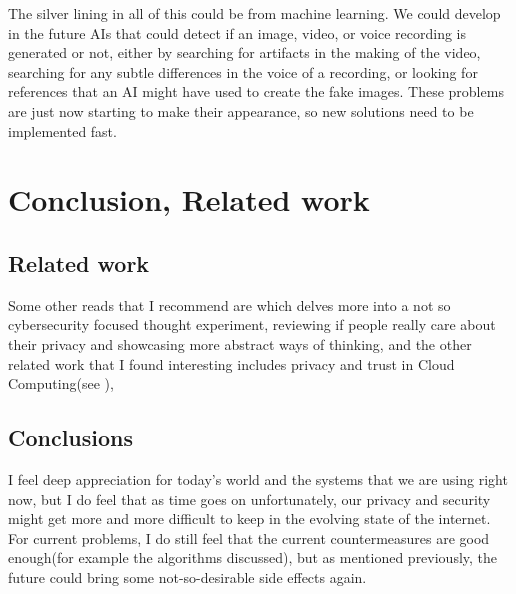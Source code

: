 \documentclass[a4paper,12pt]{report}
\begin{document}
The silver lining in all of this could be from machine learning. We could develop in the future AIs that could detect if an image, video, or voice recording is generated or not, either by searching for artifacts in the making of the video, searching for any subtle differences in the voice of a recording, or looking for references that an AI might have used to create the fake images. These problems are just now starting to make their appearance, so new solutions need to be implemented fast.

\chapter{Conclusion, Related work}

\section{Related work}

Some other reads that I recommend are \cite{Spyros} which delves more into a not so cybersecurity focused thought experiment, reviewing if people really care about their privacy and showcasing more abstract ways of thinking, and the other related work that I found interesting includes privacy and trust in Cloud Computing(see \cite{Siani}),

\section{Conclusions}

I feel deep appreciation for today's world and the systems that we are using right now, but I do feel that as time goes on unfortunately, our privacy and security might get more and more difficult to keep in the evolving state of the internet. For current problems, I do still feel that the current countermeasures are good enough(for example the algorithms discussed), but as mentioned previously, the future could bring some not-so-desirable side effects again.
\end{document}
